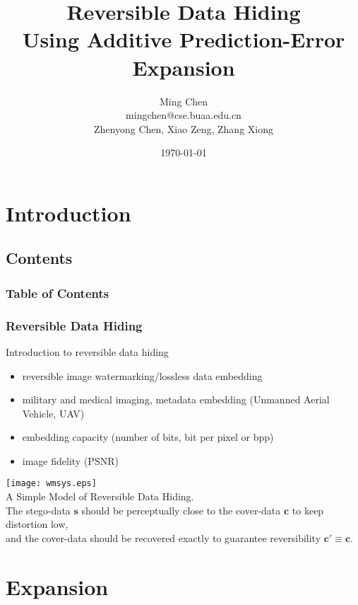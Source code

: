 \documentclass[slidestop,compress]{beamer}
\begin{document}
\title{Reversible Data Hiding \\ Using Additive Prediction-Error Expansion}
\author{Ming Chen \\ mingchen@cse.buaa.edu.cn \\ \small{Zhenyong Chen, Xiao Zeng, Zhang Xiong} }
\date{\small{\today}}

\frame[plain]{\titlepage}

\section{Introduction}
\subsection*{Contents}
\begin{frame}
    \frametitle{Table of Contents}
    \tableofcontents
\end{frame}

\begin{frame}
\frametitle{Reversible Data Hiding}
    Introduction to reversible data hiding
    \begin{itemize} 
	\item reversible image watermarking/lossless data embedding
	\item military and medical imaging, metadata embedding (Unmanned Aerial Vehicle, UAV)
	\item embedding capacity (number of bits, bit per pixel or bpp) 
	\item image fidelity (PSNR)
    \end{itemize}

    \vspace{0.2cm}
    \centering
    \texttt{[image: wmsys.eps]} \\
    \tiny{A Simple Model of Reversible Data Hiding. \\ The stego-data $\mathbf{s}$ should be
    perceptually close to the cover-data $\mathbf{c}$ to keep distortion low, \\ and the cover-data
    should be recovered exactly to guarantee reversibility $\mathbf{c'} \equiv \mathbf{c}$.}

\end{frame}

\section{Expansion}
\end{document}
